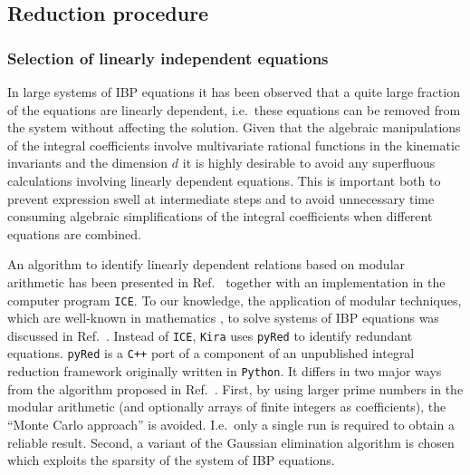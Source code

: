 \documentclass[a4paper,12pt]{scrartcl}
\newcommand*{\kira}{\texttt{Kira}}
\newcommand*{\pyred}{\texttt{pyRed}}
\newcommand*{\ice}{\texttt{ICE}}
\newcommand*{\cplusplus}{\texttt{C++}}
\newcommand*{\python}{\texttt{Python}}
\begin{document}
\subsection{Reduction procedure}
\label{reduction}

\subsubsection{Selection of linearly independent equations}
\label{PYRED}

In large systems of IBP equations it has been observed that a quite large
fraction of the equations are linearly dependent, i.e.\ these equations can be
removed from the system without affecting the solution. Given that the algebraic
manipulations of the integral coefficients involve multivariate rational
functions in the kinematic invariants and the dimension $d$ it is highly
desirable to avoid any superfluous calculations involving linearly dependent
equations. This is important both to prevent expression swell at intermediate
steps and to avoid unnecessary time consuming algebraic simplifications of the
integral coefficients when different equations are combined.

An algorithm to identify linearly dependent relations based on modular
arithmetic has been presented in Ref.~\cite{Kant:2013vta} together
with an implementation in the computer program \ice{}. 
To our knowledge, the application of modular techniques, which are
well-known in mathematics \cite{Kauers:2008zz}, to solve systems of
IBP equations was discussed in Ref.~\cite{vonManteuffel:2014ixa}.
Instead of \ice{}, \kira{} uses
\pyred{} to identify redundant equations. \pyred{} is a \cplusplus{}
port of a component of an unpublished integral reduction framework
originally written in \python{}. It differs in two major ways from the
algorithm proposed in Ref.~\cite{Kant:2013vta}. First, by using larger
prime numbers in the modular arithmetic (and optionally arrays of
finite integers as coefficients), the ``Monte Carlo approach'' is
avoided. I.e.\ only a single run is required to obtain a reliable
result. Second, a variant of the Gaussian elimination algorithm is
chosen which exploits the sparsity of the system of IBP equations.
\end{document}
